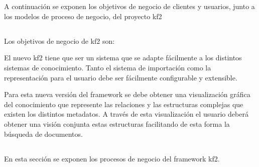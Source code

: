 \section{}

A continuación se exponen los objetivos de negocio de clientes y usuarios, junto a los modelos de proceso de negocio, del proyecto \gls{kf2}
 
\subsection{}
Los objetivos de negocio de \gls{kf2} son:
\begin{itemize}
    El nuevo \gls{kf2} tiene que ser un sistema que se adapte fácilmente a los distintos sistemas de conocimiento. Tanto el sistema de importación como la representación para el usuario debe ser fácilmente configurable y extensible.
    
	Para esta nueva versión del \gls{framework} se debe obtener una visualización gráfica del conocimiento que represente las relaciones y las estructuras complejas que existen los distintos \glspl{metadato}. A través de esta visualización el usuario deberá obtener una visión conjunta estas estructuras facilitando de esta forma la búsqueda de documentos. 
\end{itemize}

\subsection{}

En esta sección se exponen los procesos de negocio del \gls{framework} \gls{kf2}.

